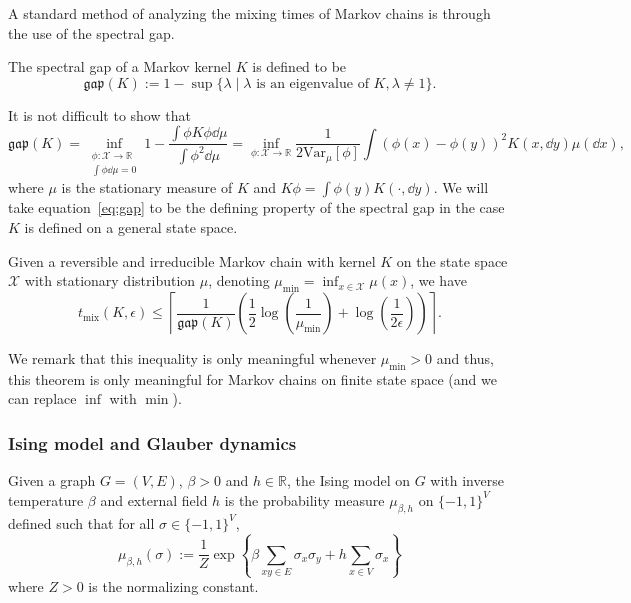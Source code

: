 A standard method of analyzing the mixing times of Markov chains is through the use of the spectral gap. 

\begin{definition}
  The spectral gap of a Markov kernel \(K\) is defined to be 
  \[\mathfrak{gap}(K) := 1 - \sup\{\lambda \mid \lambda \text{ is an eigenvalue of } K, \lambda \neq 1\}.\]
\end{definition}

It is not difficult to show that 
\begin{equation}\label{eq:gap}
  \mathfrak{gap}(K) = 
    \inf_{\substack{\phi : \mathcal{X} \to \mathbb{R}\\ \int \phi \dd \mu = 0}} 1 
      - \frac{\int \phi K \phi \dd \mu}{\int \phi^2 \dd \mu}
    = \inf_{\phi : \mathcal{X} \to \mathbb{R}} 
      \frac{1}{2 \text{Var}_\mu[\phi]} \int (\phi(x) - \phi(y))^2 K(x, \dd y) \mu(\dd x),
\end{equation}
where \(\mu\) is the stationary measure of \(K\) and \(K\phi = \int \phi(y) K(\cdot, \dd y)\). We will take 
equation~\eqref{eq:gap} to be the defining property of the spectral gap in the case \(K\) is defined on 
a general state space.

\begin{theorem}\label{thm:levin}
  Given a reversible and irreducible Markov chain with kernel \(K\) on the state space \(\mathcal{X}\) 
  with stationary distribution \(\mu\), denoting \(\mu_{\min} = \inf_{x \in \mathcal{X}} \mu(x)\), we have 
  \[t_{\text{mix}}(K, \epsilon) \le \left\lceil\frac{1}{\mathfrak{gap}(K)}
    \left(\frac{1}{2}\log\left(\frac{1}{\mu_{\min}}\right) + \log\left(\frac{1}{2\epsilon}\right)\right)\right\rceil.\]
\end{theorem}

We remark that this inequality is only meaningful whenever \(\mu_{\min} > 0\) and thus, this theorem is 
only meaningful for Markov chains on finite state space (and we can replace \(\inf\) with \(\min\)).

\subsubsection{Ising model and Glauber dynamics}

\begin{definition}
  Given a graph \(G = (V, E)\), \(\beta > 0\) and \(h \in \mathbb{R}\), the Ising model on \(G\) 
  with inverse temperature \(\beta\) and external field \(h\) is the probability measure \(\mu_{\beta, h}\) on 
  \(\{-1, 1\}^V\) defined such that for all \(\sigma \in \{-1, 1\}^V\),
  \[\mu_{\beta, h}(\sigma) := 
    \frac{1}{Z} \exp\left\{\beta \sum_{xy \in E} \sigma_x \sigma_y + h \sum_{x \in V} \sigma_x\right\}\]
  where \(Z > 0\) is the normalizing constant.
\end{definition}

